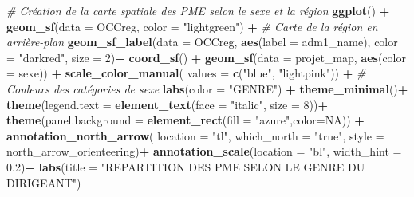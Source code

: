 \documentclass[
]{article}
\newenvironment{Shaded}{\begin{snugshade}}{\end{snugshade}}
\newcommand{\AttributeTok}[1]{\textcolor[rgb]{0.13,0.29,0.53}{#1}}
\newcommand{\CommentTok}[1]{\textcolor[rgb]{0.56,0.35,0.01}{\textit{#1}}}
\newcommand{\ConstantTok}[1]{\textcolor[rgb]{0.56,0.35,0.01}{#1}}
\newcommand{\DecValTok}[1]{\textcolor[rgb]{0.00,0.00,0.81}{#1}}
\newcommand{\FloatTok}[1]{\textcolor[rgb]{0.00,0.00,0.81}{#1}}
\newcommand{\FunctionTok}[1]{\textcolor[rgb]{0.13,0.29,0.53}{\textbf{#1}}}
\newcommand{\NormalTok}[1]{#1}
\newcommand{\SpecialCharTok}[1]{\textcolor[rgb]{0.81,0.36,0.00}{\textbf{#1}}}
\newcommand{\StringTok}[1]{\textcolor[rgb]{0.31,0.60,0.02}{#1}}
\begin{document}
\begin{Shaded}
\begin{Highlighting}[]
\CommentTok{\# Création de la carte spatiale des PME selon le sexe et la région }
\FunctionTok{ggplot}\NormalTok{() }\SpecialCharTok{+}
  \FunctionTok{geom\_sf}\NormalTok{(}\AttributeTok{data =}\NormalTok{ OCCreg, }
          \AttributeTok{color =} \StringTok{"lightgreen"}\NormalTok{) }\SpecialCharTok{+}  \CommentTok{\# Carte de la région en arrière{-}plan}
  \FunctionTok{geom\_sf\_label}\NormalTok{(}\AttributeTok{data =}\NormalTok{ OCCreg, }\FunctionTok{aes}\NormalTok{(}\AttributeTok{label =}\NormalTok{ adm1\_name),}
                \AttributeTok{color =} \StringTok{"darkred"}\NormalTok{, }\AttributeTok{size =} \DecValTok{2}\NormalTok{)}\SpecialCharTok{+}
  \FunctionTok{coord\_sf}\NormalTok{() }\SpecialCharTok{+}
  \FunctionTok{geom\_sf}\NormalTok{(}\AttributeTok{data =}\NormalTok{ projet\_map, }\FunctionTok{aes}\NormalTok{(}\AttributeTok{color =}\NormalTok{ sexe)) }\SpecialCharTok{+}
  \FunctionTok{scale\_color\_manual}\NormalTok{(}
    \AttributeTok{values =} \FunctionTok{c}\NormalTok{(}\StringTok{"blue"}\NormalTok{, }\StringTok{"lightpink"}\NormalTok{)) }\SpecialCharTok{+}  \CommentTok{\# Couleurs des catégories de sexe }
  \FunctionTok{labs}\NormalTok{(}\AttributeTok{color =} \StringTok{"GENRE"}\NormalTok{) }\SpecialCharTok{+}
  \FunctionTok{theme\_minimal}\NormalTok{()}\SpecialCharTok{+}
  \FunctionTok{theme}\NormalTok{(}\AttributeTok{legend.text =} \FunctionTok{element\_text}\NormalTok{(}\AttributeTok{face =} \StringTok{"italic"}\NormalTok{, }\AttributeTok{size =} \DecValTok{8}\NormalTok{))}\SpecialCharTok{+}
  \FunctionTok{theme}\NormalTok{(}\AttributeTok{panel.background =} \FunctionTok{element\_rect}\NormalTok{(}\AttributeTok{fill =} \StringTok{"azure"}\NormalTok{,}\AttributeTok{color=}\ConstantTok{NA}\NormalTok{)) }\SpecialCharTok{+}
  \FunctionTok{annotation\_north\_arrow}\NormalTok{(}
    \AttributeTok{location =} \StringTok{"tl"}\NormalTok{, }\AttributeTok{which\_north =} \StringTok{"true"}\NormalTok{, }\AttributeTok{style =}\NormalTok{ north\_arrow\_orienteering)}\SpecialCharTok{+}
  \FunctionTok{annotation\_scale}\NormalTok{(}\AttributeTok{location =} \StringTok{"bl"}\NormalTok{, }\AttributeTok{width\_hint =} \FloatTok{0.2}\NormalTok{)}\SpecialCharTok{+}
  \FunctionTok{labs}\NormalTok{(}\AttributeTok{title =} \StringTok{"REPARTITION DES PME SELON LE GENRE DU DIRIGEANT"}\NormalTok{)}
\end{Highlighting}
\end{Shaded}
\end{document}
